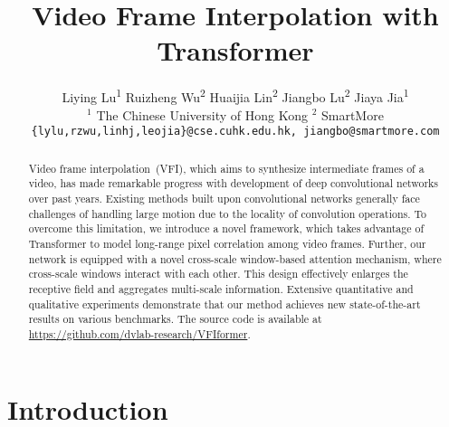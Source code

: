 \documentclass[10pt,twocolumn,letterpaper]{article}
\begin{document}
	
\title{Video Frame Interpolation with Transformer}
	
	\author{
		Liying Lu\textsuperscript{1} \quad Ruizheng Wu\textsuperscript{2} \quad Huaijia Lin\textsuperscript{2} \quad  Jiangbo Lu\textsuperscript{2} \quad Jiaya Jia\textsuperscript{1}\\
		$^1$ The Chinese University of Hong Kong \qquad
		$^2$ SmartMore\\
		{\tt\small \{lylu,rzwu,linhj,leojia\}@cse.cuhk.edu.hk, jiangbo@smartmore.com} 
	}
	
	
	\maketitle
	
\begin{abstract}
		Video frame interpolation~(VFI), which aims to synthesize intermediate frames of a video, has made remarkable progress with development of deep convolutional networks over past years. Existing methods built upon convolutional networks generally face challenges of handling large motion due to the locality of convolution operations. To overcome this limitation, we introduce a novel framework, which takes advantage of Transformer to model long-range pixel correlation among video frames. Further, our network is equipped with a novel cross-scale window-based attention mechanism, where cross-scale windows interact with each other. This design effectively enlarges the receptive field and aggregates multi-scale information. Extensive quantitative and qualitative experiments demonstrate that our method achieves new state-of-the-art results on various benchmarks. The source code is available at \href{https://github.com/dvlab-research/VFIformer}{https://github.com/dvlab-research/VFIformer}.
\end{abstract}
	


	
	
	
	
	\section{Introduction}
	\label{sec:intro}
	
	
	
\end{document}
